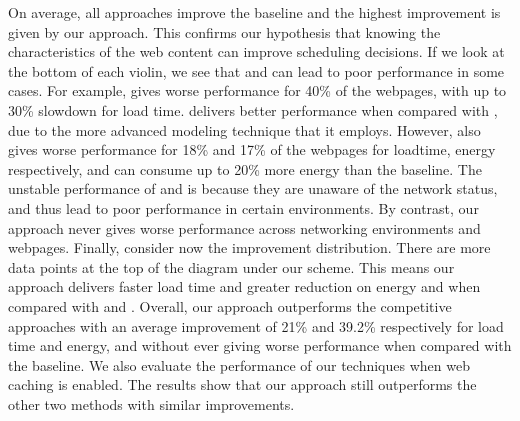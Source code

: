 On average, all approaches improve the baseline and the highest improvement is given by our approach. This confirms our hypothesis that
knowing the characteristics of the web content can improve scheduling decisions. If we look at the bottom of each violin, we see that \WS
and \SML can lead to poor performance in some cases. For example, \WS gives worse performance for 40\% of the webpages, with up to 30\%
slowdown for load time. \SML delivers better performance when compared with \WS, due to the more
advanced modeling technique that it employs. However, \SML also gives worse performance for 18\% and 17\% of the webpages for loadtime,
energy respectively, and can consume up to 20\% more energy than the baseline. The unstable performance of \WS and \SML is because they are
unaware of the network status, and thus lead to poor performance in certain environments. By contrast, our approach never gives worse
performance across networking environments and webpages. Finally, consider now the improvement distribution. There are more data points at
the top of the diagram under our scheme. This means our approach delivers faster load time and greater reduction on energy and \EDP when
compared with \WS and \SML. Overall, our approach outperforms the competitive approaches with an average improvement of 21\% and 39.2\% respectively for load time and energy, and without ever giving worse performance when compared with the baseline. We also
evaluate the performance of our techniques when web caching is enabled. The results show that our approach still outperforms the other two
methods with similar improvements.





